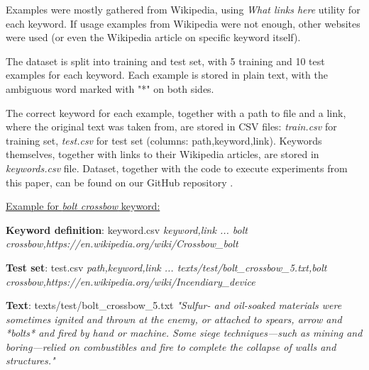\documentclass{llncs}
\begin{document}
Examples were mostly gathered from Wikipedia, using \textit{What links here} utility for each keyword.
If usage examples from Wikipedia were not enough, other websites were used (or even the Wikipedia article on specific keyword itself).

The dataset is split into training and test set, with 5 training and 10 test examples for each keyword.
Each example is stored in plain text, with the ambiguous word marked with "*" on both sides.

The correct keyword for each example, together with a path to file and a link, where the original text was taken from, are stored in CSV files: \textit{train.csv} for training set, \textit{test.csv} for test set (columns: path,keyword,link).
Keywords themselves, together with links to their Wikipedia articles, are stored in \textit{keywords.csv} file.
Dataset, together with the code to execute experiments from this paper, can be found on our GitHub repository \cite{repository}.

\bigskip
\underline{Example for \textit{bolt crossbow} keyword:}

\smallskip
\textbf{Keyword definition}: keyword.csv\newline
\textit{
keyword,link\newline
...\newline
bolt crossbow,https://en.wikipedia.org/wiki/Crossbow\_bolt\newline}

\smallskip
\textbf{Test set}: test.csv\newline
\textit{
path,keyword,link\newline
...\newline
texts/test/bolt\_crossbow\_5.txt,bolt crossbow,https://en.wikipedia.org/wiki/Incendiary\_device\newline
}

\smallskip
\textbf{Text}: texts/test/bolt\_crossbow\_5.txt\newline
\textit{"Sulfur- and oil-soaked materials were sometimes ignited and thrown at the enemy, or attached to spears, arrow and *bolts* and fired by hand or machine. Some siege techniques—such as mining and boring—relied on combustibles and fire to complete the collapse of walls and structures."}



\end{document}
